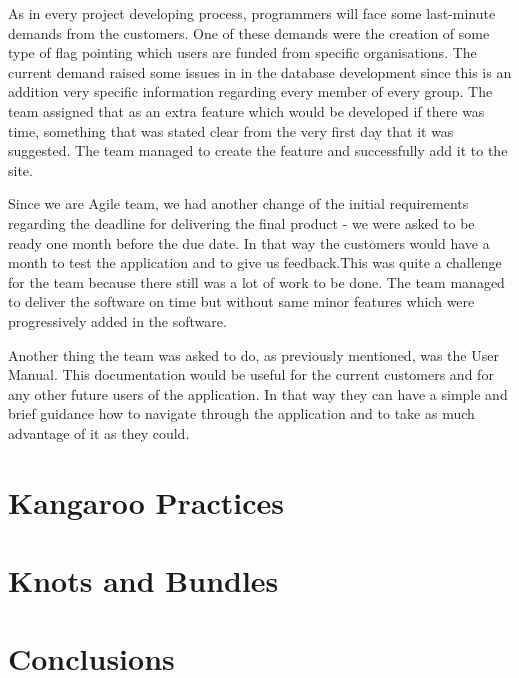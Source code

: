 \documentclass{l3proj}
\begin{document}
As in every project developing process, programmers will face some last-minute demands from the customers. One of these demands were the creation of some type of flag pointing which users are funded from specific organisations. The current demand raised some issues in in the database development since this is an addition very specific information regarding every member of every group. The team assigned that as an extra feature which would be developed if there was time, something that was stated clear from the very first day that it was suggested. The team managed to create the feature and successfully add it to the site.

Since we are Agile team, we had another change of the initial requirements regarding the deadline for delivering the final product - we were asked to be ready one month before the due date. In that way the customers would have a month to test the application and to give us feedback.This was quite a challenge for the team because there still was a lot of work to be done. The team managed to deliver the software on time but without same minor features which were progressively added in the software.

Another thing the team was asked to do, as previously mentioned, was the User Manual. This documentation would be useful for the current customers and for any other future users of the application. In that way they can have a simple and brief guidance how to navigate through the application and to take as much advantage of it as they could.



\section{Kangaroo Practices}



\section{Knots and Bundles}
\label{sec:managing}


\section{Conclusions}
\end{document}
